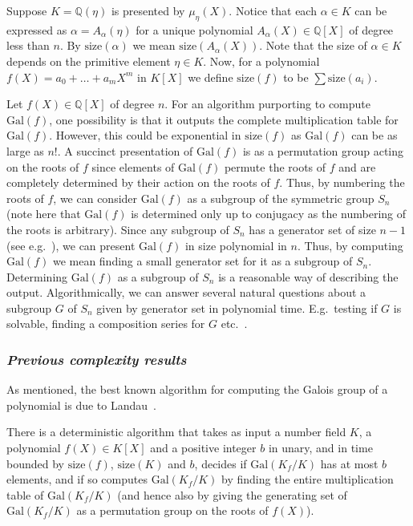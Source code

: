 \documentclass{llncs}
\newcommand{\size}[1]{{\ensuremath{\mathrm{size}\left(#1\right)}}}
\newcommand{\Gal}[1]{{\ensuremath{\mathrm{Gal}\left(#1\right)}}}
\newcommand{\Q}{\ensuremath{\mathbb{Q}}}
\begin{document}
Suppose $K=\Q(\eta)$ is presented by $\mu_\eta(X)$.  Notice that each
$\alpha\in K$ can be expressed as $\alpha = A_\alpha(\eta)$ for a
unique polynomial $A_\alpha(X) \in \Q[X]$ of degree less than $n$. By
$\size{\alpha}$ we mean $\size{A_\alpha(X)}$.  Note that the size of
$\alpha \in K$ depends on the primitive element $\eta\in K$. Now, for
a polynomial $f(X) = a_0 + \ldots + a_m X^m$ in $K[X]$ we define
$\size{f}$ to be $\sum \size{a_i}$.

Let $f(X) \in \Q[X]$ of degree $n$. For an algorithm purporting to
compute $\Gal{f}$, one possibility is that it outputs the complete
multiplication table for $\Gal{f}$. However, this could be exponential
in $\size{f}$ as $\Gal{f}$ can be as large as $n!$. A succinct
presentation of $\Gal{f}$ is as a permutation group acting on the
roots of $f$ since elements of $\Gal{f}$ permute the roots of $f$ and
are completely determined by their action on the roots of $f$. Thus,
by numbering the roots of $f$, we can consider $\Gal{f}$ as a subgroup
of the symmetric group $S_n$ (note here that $\Gal{f}$ is determined
only up to conjugacy as the numbering of the roots is arbitrary).
Since any subgroup of $S_n$ has a generator set of size $n-1$ (see
e.g.\ \cite{luks93permutation}), we can present $\Gal{f}$ in size
polynomial in $n$. Thus, by computing $\Gal{f}$ we mean finding a
small generator set for it as a subgroup of $S_n$. Determining
$\Gal{f}$ as a subgroup of $S_n$ is a reasonable way of describing the
output. Algorithmically, we can answer several natural questions about
a subgroup $G$ of $S_n$ given by generator set in polynomial time.
E.g.\ testing if $G$ is solvable, finding a composition series for $G$
etc.\ \cite{luks93permutation}.

\subsubsection*{\it Previous complexity results}

As mentioned, the best known algorithm for computing the Galois group
of a polynomial is due to Landau~\cite{landau84galois}.

\begin{theorem}[Landau] \label{thm-landau-galois-algo} There is a
  deterministic algorithm that takes as input a number field $K$, a
  polynomial $f(X) \in K[X]$ and a positive integer $b$ in unary, and
  in time bounded by $\size{f}$, $\size{K}$ and $b$, decides if
  $\Gal{K_f/K}$ has at most $b$ elements, and if so computes
  $\Gal{K_f/K}$ by finding the entire multiplication table of
  $\Gal{K_f/K}$ (and hence also by giving the generating set of
  $\Gal{K_f/K}$ as a permutation group on the roots of $f(X)$).
\end{theorem}
\end{document}
